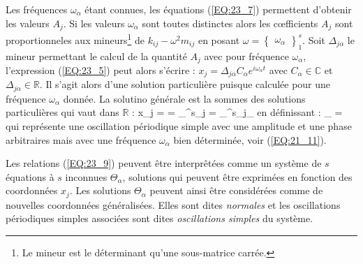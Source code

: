 Les fr\'equences $\omega_{\alpha}$ \'etant connues, les \'equations (\ref{EQ:23_7}) permettent d'obtenir les valeurs $A_{j}$. Si les valeurs $\omega_{\alpha}$ sont toutes distinctes alors les c{\oe}fficients $A_{j}$ sont proportionneles aux mineurs\footnote{Le mineur est le d\'eterminant qu'une sous-matrice carr\'ee.} de $k_{ij} - \omega^{2}m_{ij}$ en posant $\omega = \begin{Bmatrix}\omega_{\alpha}\end{Bmatrix}^{s}_{1}$. Soit $\Delta_{j\alpha}$ le mineur permettant le calcul de la quantit\'e $A_{j}$ avec pour fr\'equence $\omega_{\alpha}$, l'expression (\ref{EQ:23_5}) peut alors s'\'ecrire : $x_{j} = \Delta_{j\alpha}C_{\alpha}e^{i\omega_{\alpha}t}$ avec $C_{\alpha} \in \mathbb{C}$ et $\Delta_{j\alpha} \in \mathbb{R}$. Il s'agit alors d'une solution particuli\`ere puisque calcul\'ee pour une fr\'equence $\omega_{\alpha}$ donn\'ee. La solutino g\'en\'erale est la sommes des solutions particuli\`eres qui vaut dans $\mathbb{R}$ :
\be
	x_{j} =  = \sum_{}^{s}\Delta_{j\alpha} = \sum_{}^{s}\Delta_{j\alpha}\Theta_{\alpha} \label{EQ:23_9}
\ee
en d\'efinissant :
\be
	\Theta_{\alpha} =  \label{EQ:23_10}
\ee
qui repr\'esente une oscillation p\'eriodique simple avec une amplitude et une phase arbitraires mais avec une fr\'equence $\omega_{\alpha}$ bien d\'etermin\'ee, voir (\ref{EQ:21_11}).

Les relations (\ref{EQ:23_9}) peuvent \^etre interpr\^et\'ees comme un syst\`eme de $s$ \'equations \`a $s$ inconnues $\Theta_{\alpha}$, solutions qui peuvent \^etre exprim\'ees en fonction des coordonn\'ees $x_{j}$. Les solutions $\Theta_{\alpha}$ peuvent ainsi \^etre consid\'er\'ees comme de nouvelles coordonn\'ees g\'en\'eralis\'ees. Elles sont dites \emph{normales} et les oscillations p\'eriodiques simples associ\'ees sont dites \emph{oscillations simples} du syst\`eme.


